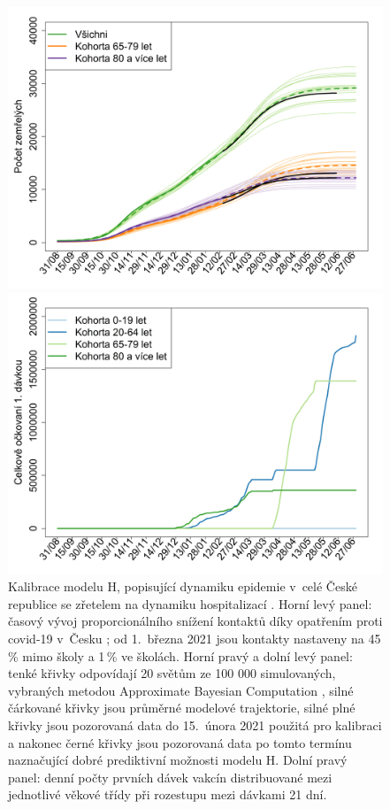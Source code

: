 \begin{figure}[p]
\begin{center}
\begin{minipage}[m]{0.45\linewidth}
			\includegraphics[width=\textwidth]{pic/vakcinace-death.png}
		\end{minipage} 
		\begin{minipage}[m]{0.45\linewidth}
			\includegraphics[width=\textwidth]{pic/vakcinace-davky.png}
		\end{minipage} 
	\end{center}
	\caption{Kalibrace modelu H, popisující dynamiku epidemie v~celé České republice se zřetelem na dynamiku hospitalizací \cite{vaccpaper}. Horní levý panel: časový vývoj proporcionálního snížení kontaktů díky opatřením proti covid-19 v~Česku \cite{paqcovid}; od 1.\ března 2021 jsou kontakty nastaveny na 45\,\% mimo školy a 1\,\% ve školách. Horní pravý a dolní levý panel: tenké křivky odpovídají 20  světům ze 100 000 simulovaných, vybraných metodou Approximate Bayesian Computation \cite{Toni_etal2009}, silné čárkované křivky jsou průměrné modelové trajektorie, silné plné křivky jsou pozorovaná data do 15.\ února 2021 použitá pro kalibraci a nakonec černé křivky jsou pozorovaná data po tomto termínu naznačující dobré prediktivní možnosti modelu H. Dolní pravý panel: denní počty prvních dávek vakcín distribuované mezi jednotlivé věkové třídy při rozestupu mezi dávkami 21 dní.}
	\label{kalibraceH}
\end{figure}

